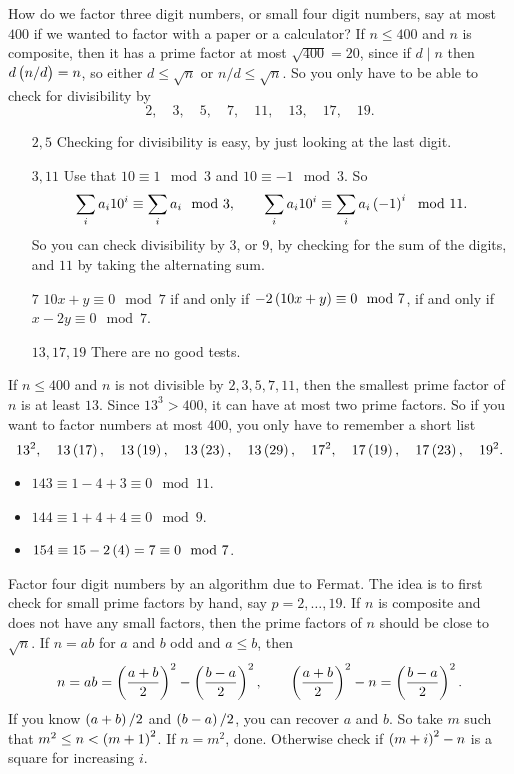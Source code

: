 How do we factor three digit numbers, or small four digit numbers, say at most $ 400 $ if we wanted to factor with a paper or a calculator? If $ n \le 400 $ and $ n $ is composite, then it has a prime factor at most $ \sqrt{400} = 20 $, since if $ d \mid n $ then $ d\br{n / d} = n $, so either $ d \le \sqrt{n} $ or $ n / d \le \sqrt{n} $. So you only have to be able to check for divisibility by
$$ 2, \quad 3, \quad 5, \quad 7, \quad 11, \quad 13, \quad 17, \quad 19. $$
\begin{itemize}[leftmargin=0.75in]
\item[$ 2, 5 $] Checking for divisibility is easy, by just looking at the last digit.
\item[$ 3, 11 $] Use that $ 10 \equiv 1 \mod 3 $ and $ 10 \equiv -1 \mod 3 $. So
$$ \sum_i a_i10^i \equiv \sum_i a_i \mod 3, \qquad \sum_i a_i10^i \equiv \sum_i a_i\br{-1}^i \mod 11. $$
So you can check divisibility by $ 3 $, or $ 9 $, by checking for the sum of the digits, and $ 11 $ by taking the alternating sum.
\item[$ 7 $] $ 10x + y \equiv 0 \mod 7 $ if and only if $ -2\br{10x + y} \equiv 0 \mod 7 $, if and only if $ x - 2y \equiv 0 \mod 7 $.
\item[$ 13, 17, 19 $] There are no good tests.
\end{itemize}
If $ n \le 400 $ and $ n $ is not divisible by $ 2, 3, 5, 7, 11 $, then the smallest prime factor of $ n $ is at least $ 13 $. Since $ 13^3 > 400 $, it can have at most two prime factors. So if you want to factor numbers at most $ 400 $, you only have to remember a short list
$$ 13^2, \quad 13\br{17}, \quad 13\br{19}, \quad 13\br{23}, \quad 13\br{29}, \quad 17^2, \quad 17\br{19}, \quad 17\br{23}, \quad 19^2. $$

\begin{example*}
\hfill
\begin{itemize}
\item $ 143 \equiv 1 - 4 + 3 \equiv 0 \mod 11 $.
\item $ 144 \equiv 1 + 4 + 4 \equiv 0 \mod 9 $.
\item $ 154 \equiv 15 - 2\br{4} = 7 \equiv 0 \mod 7 $.
\end{itemize}
\end{example*}


Factor four digit numbers by an algorithm due to Fermat. The idea is to first check for small prime factors by hand, say $ p = 2, \dots, 19 $. If $ n $ is composite and does not have any small factors, then the prime factors of $ n $ should be close to $ \sqrt{n} $. If $ n = ab $ for $ a $ and $ b $ odd and $ a \le b $, then
$$ n = ab = \br{\dfrac{a + b}{2}}^2 - \br{\dfrac{b - a}{2}}^2, \qquad \br{\dfrac{a + b}{2}}^2 - n = \br{\dfrac{b - a}{2}}^2. $$
If you know $ \br{a + b} / 2 $ and $ \br{b - a} / 2 $, you can recover $ a $ and $ b $. So take $ m $ such that $ m^2 \le n < \br{m + 1}^2 $. If $ n = m^2 $, done. Otherwise check if $ \br{m + i}^2 - n $ is a square for increasing $ i $.

